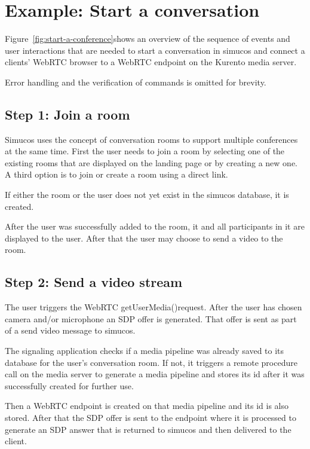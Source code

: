 \documentclass[../../../thesis.tex]{subfiles}
\begin{document}
\section{Example: Start a conversation}

Figure~\ref{fig:start-a-conference}\footnotemark shows an overview of the sequence of events and user interactions that are needed to start a conversation in simucos and connect a clients' WebRTC browser to a WebRTC endpoint on the Kurento media server. \par



\noindent Error handling and the verification of commands is omitted for brevity.

\subsection{Step 1: Join a room}
Simucos uses the concept of conversation rooms to support multiple conferences at the same time. First the user needs to join a room by selecting one of the existing rooms that are displayed on the landing page or by creating a new one. A third option is to join or create a room using a direct link.\par
If either the room or the user does not yet exist in the simucos database, it is created.\par
After the user was successfully added to the room, it  and all participants in it are displayed to the user. After that the user may choose to send a video to the room.

\subsection{Step 2: Send a video stream}
The user triggers the WebRTC getUserMedia()\footnotemark request. After the user has chosen camera and/or microphone an SDP offer is generated. That offer is sent as part of a send video message to simucos.\par
The signaling application checks if a media pipeline was already saved to its database for the user's conversation room. If not, it triggers a remote procedure call on the media server to generate a media pipeline and stores its id after it was successfully created for further use.\par
Then a WebRTC endpoint is created on that media pipeline and its id is also stored. After that the SDP offer is sent to the endpoint where it is processed to generate an SDP answer that is returned to simucos and then delivered to the client.\par
\end{document}
